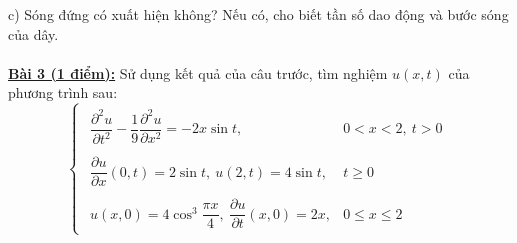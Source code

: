 \documentclass[10.5pt, a4paper]{article}
\begin{document}
\color{red}c) \color{black}Sóng đứng có xuất hiện không? Nếu có, cho biết tần số dao động và bước sóng của dây.\\\\
\color{red}\underline{\textbf{Bài 3 (1 điểm):}} \color{black}Sử dụng kết quả của câu trước, tìm nghiệm $u(x,t)$ của phương trình sau: $$\begin{cases}
\begin{array}{ll}
\dfrac{\partial^2u}{\partial t^2}-\dfrac19\dfrac{\partial^2u}{\partial x^2}=-2x\sin t, & 0<x<2,~t>0\\\\
\dfrac{\partial u}{\partial x}(0,t)=2\sin t,~u(2,t)=4\sin t, & t\ge0\\\\
u(x,0)=4\cos^3\dfrac{\pi x}{4},~\dfrac{\partial u}{\partial t}(x,0)=2x, & 0\le x\le2
\end{array}
\end{cases}$$

\newpage
\end{document}
